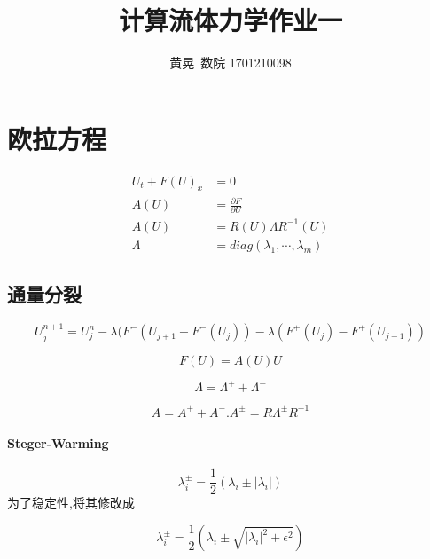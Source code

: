 \documentclass[UTF8]{ctexart}
\author{黄晃\ 数院 1701210098 }
\title{计算流体力学作业一}
\begin{document}
  \maketitle

\section{欧拉方程}



  \begin{equation*}
  \begin{split}
      U_t+F(U)_x&=0 \\
    A(U)&=\frac{\partial F}{\partial U} \\
    A(U)&=R(U)\Lambda R^{-1}(U)\\
    \Lambda &= diag(\lambda_1,\cdots,\lambda_m)
  \end{split}
  \end{equation*}
\subsection{通量分裂}
  $$
  U_j^{n+1}=U_j^n-\lambda(F^-(U_{j+1}-F^-(U_j))-\lambda(F^+(U_j)-F^+(U_{j-1}))
  $$

$$
F(U)=A(U)U
$$

$$
\Lambda = \Lambda^++\Lambda^-
$$



$$
A=A^++A^-.A^{\pm}=R\Lambda^{\pm} R^{-1}
$$

\paragraph{Steger-Warming}
$$
\lambda_i^{\pm}=\frac{1}{2}(\lambda_i\pm |\lambda_i|)
$$
为了稳定性,将其修改成

$$
\lambda_i^{\pm}=\frac{1}{2}(\lambda_i\pm \sqrt{|\lambda_i|^2+\epsilon^2})
$$
\end{document}
